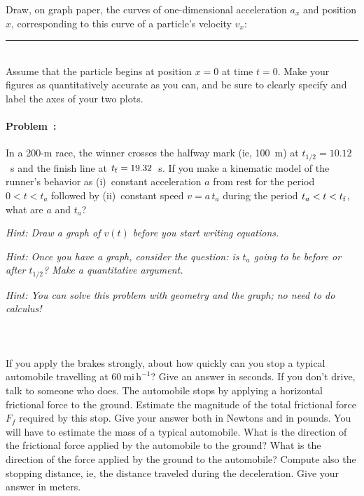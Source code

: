 \documentclass[12pt]{article}
\newcounter{problem}
\begin{document}
Draw, on graph paper, the curves of one-dimensional acceleration $a_x$
and position $x$, corresponding to this curve of a particle's velocity
$v_x$:
\\ \rule{0.1\textwidth}{0pt}
\\
Assume that the particle begins at position $x=0$ at time $t=0$.  Make
your figures as quantitatively accurate as you can, and be sure to
clearly specify and label the axes of your two plots.

\paragraph{Problem~\theproblem:}%
In a 200-m race, the winner crosses the halfway mark (ie, 100~m) at
$t_{1/2}=10.12$~s and the finish line at $t_{\rm f}=19.32$~s.  If you
make a kinematic model of the runner's behavior as (i)~constant
acceleration $a$ from rest for the period $0<t<t_a$ followed by
(ii)~constant speed $v=a\,t_a$ during the period $t_a<t<t_{\rm f}$,
what are $a$ and $t_a$?

\emph{Hint: Draw a graph of $v(t)$ before you start writing equations.}

\emph{Hint: Once you have a graph, consider the question: is $t_a$
going to be before or after $t_{1/2}$?  Make a quantitative argument.}

\emph{Hint: You can solve this problem with geometry and the graph; no
  need to do calculus!}

\paragraph{\problemname~\theproblem}

If you apply the brakes strongly, about how quickly can you stop a
typical automobile travelling at $60~\mathrm{mi\,h^{-1}}$?  Give an
answer in seconds.  If you don't drive, talk to someone who does.  The
automobile stops by applying a horizontal frictional force to the
ground.  Estimate the magnitude of the total frictional force $F_f$
required by this stop.  Give your answer both in Newtons and in
pounds.  You will have to estimate the mass of a typical automobile.
What is the direction of the frictional force applied by the
automobile to the ground?  What is the direction of the force applied
by the ground to the automobile?  Compute also the stopping distance,
ie, the distance traveled during the deceleration.  Give your answer
in meters.
\end{document}
